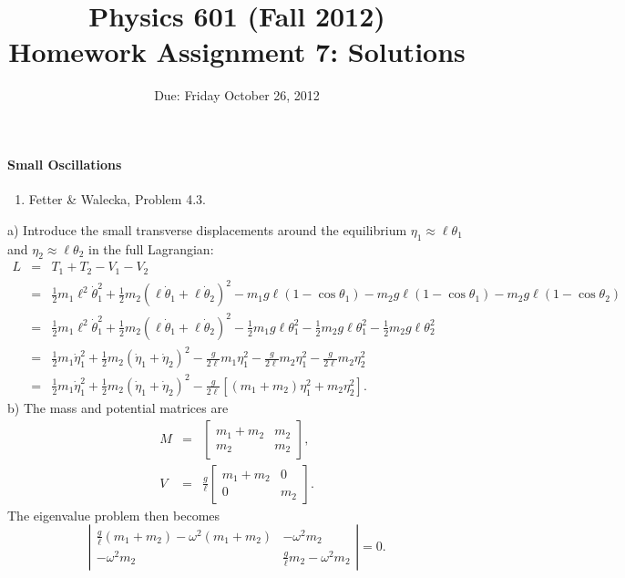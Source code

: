 \documentclass[letterpaper,11pt]{article}
\title{Physics 601 (Fall 2012) \\ Homework Assignment 7: Solutions}
\date{Due: Friday October 26, 2012}
\begin{document}
\maketitle

\paragraph*{Small Oscillations}
\begin{enumerate}
 \item Fetter \& Walecka, Problem 4.3.
\end{enumerate}
a) Introduce the small transverse displacements around the equilibrium $\eta_1 \approx \ell\theta_1$ and $\eta_2 \approx \ell\theta_2$ in the full Lagrangian:
\begin{eqnarray*}
 L & = & T_1 + T_2 - V_1 - V_2 \\
 & = & \frac{1}{2}m_1 \ell^2\dot\theta_1^2 + \frac{1}{2}m_2 (\ell\dot\theta_1 + \ell\dot\theta_2)^2 - m_1g\ell(1 - \cos\theta_1) - m_2g\ell(1 - \cos\theta_1) - m_2g\ell(1 - \cos\theta_2) \\
 & = & \frac{1}{2}m_1 \ell^2\dot\theta_1^2 + \frac{1}{2}m_2 (\ell\dot\theta_1 + \ell\dot\theta_2)^2 - \frac{1}{2}m_1g\ell\theta_1^2 - \frac{1}{2}m_2g\ell\theta_1^2 - \frac{1}{2}m_2g\ell\theta_2^2 \\
 & = & \frac{1}{2}m_1 \dot\eta_1^2 + \frac{1}{2}m_2 (\dot\eta_1 + \dot\eta_2)^2 - \frac{g}{2\ell}m_1\eta_1^2 - \frac{g}{2\ell}m_2\eta_1^2 - \frac{g}{2\ell}m_2\eta_2^2 \\
 & = & \frac{1}{2}m_1 \dot\eta_1^2 + \frac{1}{2}m_2 (\dot\eta_1 + \dot\eta_2)^2 - \frac{g}{2\ell}\left[ (m_1+m_2)\eta_1^2 + m_2\eta_2^2\right].
\end{eqnarray*}
b) The mass and potential matrices are
\begin{eqnarray*}
 M & = & \left[ \begin{array}{cc}
          m_1 + m_2 & m_2 \\
          m_2 & m_2
         \end{array} \right], \\
 V & = & \frac{g}{\ell}
         \left[ \begin{array}{cc}
          m_1 + m_2 & 0 \\
          0 & m_2 
         \end{array} \right].
\end{eqnarray*}
The eigenvalue problem then becomes
\begin{equation*}
 \left| \begin{array}{cc}
  \frac{g}{\ell} (m_1 + m_2) - \omega^2 (m_1 + m_2) & - \omega^2 m_2 \\
  - \omega^2 m_2 & \frac{g}{\ell} m_2 - \omega^2 m_2
 \end{array} \right| = 0.
\end{equation*}
\end{document}
